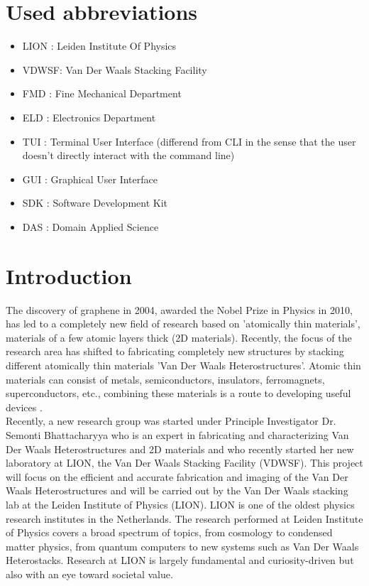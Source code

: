 \documentclass[11pt]{article}
\begin{document}
\newpage

\tableofcontents
\newpage

\section*{Used abbreviations}
\label{ap:veel_gebruikte_symbolen}
\begin{itemize}[noitemsep]
    \item LION : Leiden Institute Of Physics
    \item VDWSF: Van Der Waals Stacking Facility
    \item FMD : Fine Mechanical Department
    \item ELD : Electronics Department
    \item TUI : Terminal User Interface (differend from CLI in the sense that the user doesn't directly interact with the command line)
    \item GUI : Graphical User Interface
    \item SDK : Software Development Kit
    \item DAS : Domain Applied Science

\end{itemize}

\clearpage
{}

\section{Introduction}
The discovery of graphene in 2004, awarded the Nobel Prize in Physics in 2010, has led to a completely new field of research based on 'atomically thin materials', materials of a few atomic layers thick (2D materials). 
Recently, the focus of the research area has shifted to fabricating completely new structures by stacking different atomically thin materials 'Van Der Waals Heterostructures'. 
Atomic thin materials can consist of metals, semiconductors, insulators, ferromagnets, superconductors, etc., combining these materials is a route to developing useful devices \citep{geimVanWaalsHeterostructures2013}. \\

Recently, a new research group was started under Principle Investigator Dr. Semonti Bhattacharyya who is an expert in fabricating and characterizing Van Der Waals Heterostructures and 2D materials and who recently started her new laboratory at LION, the Van Der Waals Stacking Facility (VDWSF).
This project will focus on the efficient and accurate fabrication and imaging of the Van Der Waals Heterostructures and will be carried out by the Van Der Waals stacking lab at the Leiden Institute of Physics (LION). 
LION is one of the oldest physics research institutes in the Netherlands. 
The research performed at Leiden Institute of Physics covers a broad spectrum of topics, from cosmology to condensed matter physics, from quantum computers to new systems such as Van Der Waals Heterostacks.
Research at LION is largely fundamental and curiosity-driven but also with an eye toward societal value. \\
\end{document}
